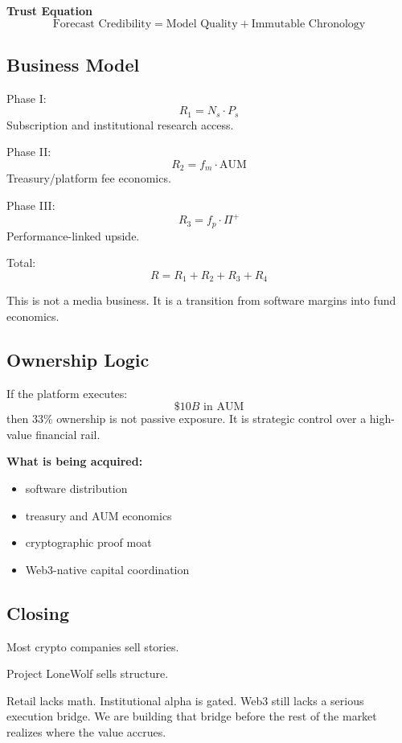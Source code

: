 \documentclass[11pt]{article}
\begin{document}
\begin{thesisbox}
\textbf{Trust Equation}
\[
\text{Forecast Credibility} = \text{Model Quality} + \text{Immutable Chronology}
\]
\end{thesisbox}

\subsection*{Business Model}

Phase I:
\[
R_1 = N_s \cdot P_s
\]
Subscription and institutional research access.

Phase II:
\[
R_2 = f_m \cdot \text{AUM}
\]
Treasury/platform fee economics.

Phase III:
\[
R_3 = f_p \cdot \Pi^+
\]
Performance-linked upside.

Total:
\[
R = R_1 + R_2 + R_3 + R_4
\]

This is not a media business. It is a transition from software margins into fund economics.

\subsection*{Ownership Logic}

If the platform executes:
\[
\$10B \text{ in AUM}
\]
then 33\% ownership is not passive exposure. It is strategic control over a high-value financial rail.

\begin{aggressivebox}
\textbf{What is being acquired:}
\begin{itemize}[leftmargin=1.5em]
  \item software distribution
  \item treasury and AUM economics
  \item cryptographic proof moat
  \item Web3-native capital coordination
\end{itemize}
\end{aggressivebox}

\subsection*{Closing}

Most crypto companies sell stories.

Project LoneWolf sells structure.

Retail lacks math. Institutional alpha is gated. Web3 still lacks a serious execution bridge. We are building that bridge before the rest of the market realizes where the value accrues.
\end{document}
